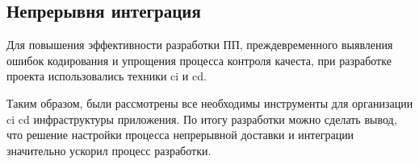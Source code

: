 \subsection{Непрерывня интеграция}
\label{sec:testing:ci}

Для повышения эффективности разработки ПП, преждевременного выявления ошибок кодирования и упрощения процесса контроля качеста, при разработке проекта использовались техники \gls{ci} и \gls{cd}.







Таким образом, были рассмотрены все необходимы инструменты для организации \gls{ci} \gls{cd} инфраструктуры приложения. По итогу разработки можно сделать вывод, что решение настройки процесса непрерывной доставки и интеграции значительно ускорил процесс разработки.